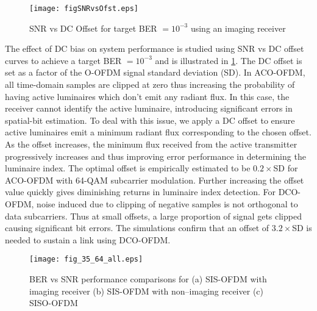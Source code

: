 \begin{figure}[!t]
\centering
		\texttt{[image: figSNRvsOfst.eps]}
\caption[SNR vs DC Offset for SIS-OFDM]{SNR vs DC Offset for target BER $= 10^{-3}$ using an imaging receiver}
	\label{fig:SNRvsOfst}
\end{figure}

The effect of DC bias on system performance is studied using SNR vs DC offset curves to achieve a target BER $=10^{-3}$ and is illustrated in \figurename{\ref{fig:SNRvsOfst}}. The DC offset is set as a factor of the O-OFDM signal standard deviation (SD). In ACO-OFDM, all time-domain samples are clipped at zero thus increasing the probability of having active luminaires which don't emit any radiant flux. In this case, the receiver cannot identify the active luminaire, introducing significant errors in spatial-bit estimation. To deal with this issue, we apply a DC offset to ensure active luminaires emit a minimum radiant flux corresponding to the chosen offset. As the offset increases, the minimum flux received from the active transmitter progressively increases and thus improving error performance in determining the luminaire index. The optimal offset is empirically estimated to be $0.2\times$SD for ACO-OFDM with 64-QAM subcarrier modulation. Further increasing the offset value quickly gives diminishing returns in luminaire index detection. For DCO-OFDM, noise induced due to clipping of negative samples is not orthogonal to data subcarriers. Thus at small offsets, a large proportion of signal gets clipped causing significant bit errors. The simulations confirm that an offset of $3.2\times$SD is needed to sustain a link using DCO-OFDM.

\begin{figure}[!t]
\centering
\texttt{[image: fig\_35\_64\_all.eps]}
\caption[SIS-OFDM and SISO-OFDM performance comparisons]{BER vs SNR performance comparisons for (a) SIS-OFDM with imaging receiver (b) SIS-OFDM with non--imaging receiver (c) SISO-OFDM}
	\label{fig:BERnet}
\end{figure}

